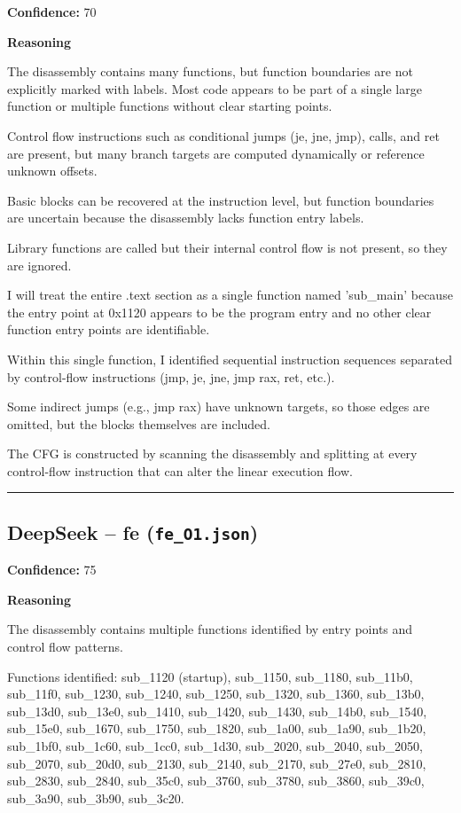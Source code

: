 \textbf{Confidence:} 70

\textbf{Reasoning}

The disassembly contains many functions, but function boundaries are not explicitly marked with labels. Most code appears to be part of a single large function or multiple functions without clear starting points.

Control flow instructions such as conditional jumps (je, jne, jmp), calls, and ret are present, but many branch targets are computed dynamically or reference unknown offsets.

Basic blocks can be recovered at the instruction level, but function boundaries are uncertain because the disassembly lacks function entry labels.

Library functions are called but their internal control flow is not present, so they are ignored.

I will treat the entire .text section as a single function named 'sub\_main' because the entry point at 0x1120 appears to be the program entry and no other clear function entry points are identifiable.

Within this single function, I identified sequential instruction sequences separated by control-flow instructions (jmp, je, jne, jmp rax, ret, etc.).

Some indirect jumps (e.g., jmp rax) have unknown targets, so those edges are omitted, but the blocks themselves are included.

The CFG is constructed by scanning the disassembly and splitting at every control-flow instruction that can alter the linear execution flow.

\bigskip
\hrule
\bigskip

\subsection{DeepSeek -- fe (\texttt{fe\_O1.json})}

\textbf{Confidence:} 75

\textbf{Reasoning}

The disassembly contains multiple functions identified by entry points and control flow patterns.

Functions identified: sub\_1120 (startup), sub\_1150, sub\_1180, sub\_11b0, sub\_11f0, sub\_1230, sub\_1240, sub\_1250, sub\_1320, sub\_1360, sub\_13b0, sub\_13d0, sub\_13e0, sub\_1410, sub\_1420, sub\_1430, sub\_14b0, sub\_1540, sub\_15e0, sub\_1670, sub\_1750, sub\_1820, sub\_1a00, sub\_1a90, sub\_1b20, sub\_1bf0, sub\_1c60, sub\_1cc0, sub\_1d30, sub\_2020, sub\_2040, sub\_2050, sub\_2070, sub\_20d0, sub\_2130, sub\_2140, sub\_2170, sub\_27e0, sub\_2810, sub\_2830, sub\_2840, sub\_35c0, sub\_3760, sub\_3780, sub\_3860, sub\_39c0, sub\_3a90, sub\_3b90, sub\_3c20.

